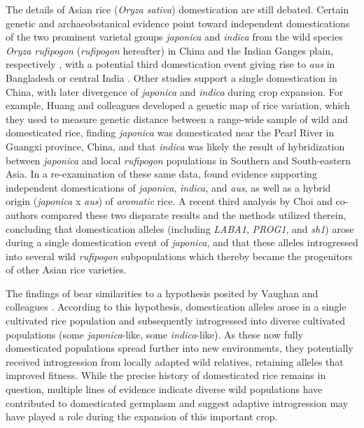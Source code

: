 \documentclass[11pt]{article}
\begin{document}
\begin{enumerate}
The details of Asian rice (\emph{Oryza sativa}) domestication are still debated.
Certain genetic and archaeobotanical evidence point toward independent domestications of the two prominent varietal groups \emph{japonica} and \emph{indica} from the wild species \emph{Oryza rufipogon} (\emph{rufipogon} hereafter) in China and the Indian Ganges plain, respectively \cite{fuller2010consilience}, with a potential third domestication event giving rise to \emph{aus} in Bangladesh or central India \cite{civavn2015three}.
Other studies support a single domestication in China, with later divergence of \emph{japonica} and \emph{indica} \cite{molina2011molecular, Huang2012} during crop expansion.
For example, Huang and colleagues \cite{Huang2012} developed a genetic map of rice variation, which they used to measure genetic distance between a range-wide sample of wild and domesticated rice, finding \emph{japonica} was domesticated near the Pearl River in Guangxi province, China, and that \emph{indica} was likely the result of hybridization between \emph{japonica} and local \emph{rufipogon} populations in Southern and South-eastern Asia.
In a re-examination of these same data, \cite{civavn2015three} found evidence supporting independent domestications of \emph{japonica}, \emph{indica}, and \emph{aus}, as well as a hybrid origin (\emph{japonica} x \emph{aus}) of \emph{aromatic} rice.
A recent third analysis by Choi and co-authors \cite{choi2018multiple} compared these two disparate results and the methods utilized therein, concluding that domestication alleles (including \emph{LABA1}, \emph{PROG1}, and \emph{sh1}) arose during a single domestication event of \emph{japonica}, and that these alleles introgressed into several wild \emph{rufipogon} subpopulations which thereby became the progenitors of other Asian rice varieties.


The findings of \cite{choi2018multiple} bear similarities to a hypothesis posited by Vaughan and colleagues \cite{vaughan2008evolving}.
According to this hypothesis, domestication alleles arose in a single cultivated rice population and subsequently introgressed into diverse cultivated populations (some \emph{japonica}-like, some \emph{indica}-like).
As these now fully domesticated populations spread further into new environments, they potentially received introgression from locally adapted wild relatives, retaining alleles that improved fitness.
While the precise history of domesticated rice remains in question, multiple lines of evidence indicate diverse wild populations have contributed to domesticated germplasm and suggest adaptive introgression may have played a role during the expansion of this important crop.



\end{enumerate}
\end{document}
